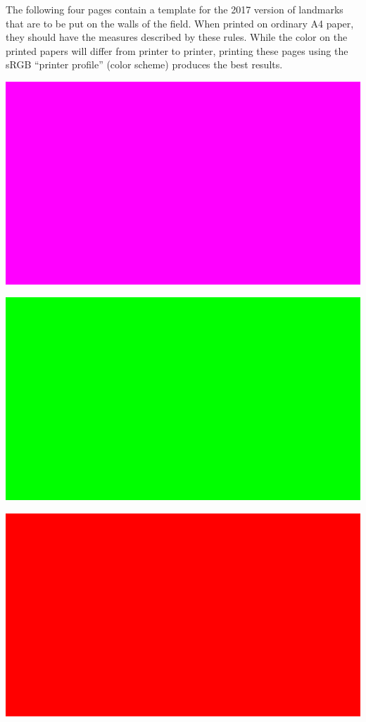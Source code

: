 \documentclass{article}
\begin{document}
The following four pages contain a template for the 2017 version
    of landmarks that are to be put on the walls of the field. When printed on
ordinary A4 paper, they should have the measures described by these rules.
While the color on the printed papers will differ from printer to printer,
printing these pages using the sRGB ``printer profile'' (color scheme) produces
the best results.

\newpage

\includegraphics[width=1\textwidth]{media/image11.png}

\includegraphics[width=1\textwidth]{media/image12.png}

\includegraphics[width=1\textwidth]{media/image13.png}
\end{document}
